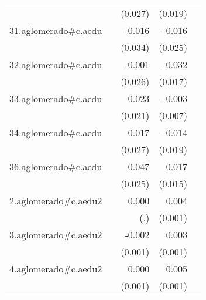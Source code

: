 {\begin{longtable}{l*{4}{D{.}{.}{-1}}}
            &                     &     (0.027)         &     (0.019)         &                     \\
\addlinespace
31.aglomerado#c.aedu&                     &      -0.016         &      -0.016         &                     \\
            &                     &     (0.034)         &     (0.025)         &                     \\
\addlinespace
32.aglomerado#c.aedu&                     &      -0.001         &      -0.032         &                     \\
            &                     &     (0.026)         &     (0.017)         &                     \\
\addlinespace
33.aglomerado#c.aedu&                     &       0.023         &      -0.003         &                     \\
            &                     &     (0.021)         &     (0.007)         &                     \\
\addlinespace
34.aglomerado#c.aedu&                     &       0.017         &      -0.014         &                     \\
            &                     &     (0.027)         &     (0.019)         &                     \\
\addlinespace
36.aglomerado#c.aedu&                     &       0.047         &       0.017         &                     \\
            &                     &     (0.025)         &     (0.015)         &                     \\
\addlinespace
2.aglomerado#c.aedu2&                     &       0.000         &       0.004\sym{***}&                     \\
            &                     &         (.)         &     (0.001)         &                     \\
\addlinespace
3.aglomerado#c.aedu2&                     &      -0.002         &       0.003\sym{**} &                     \\
            &                     &     (0.001)         &     (0.001)         &                     \\
\addlinespace
4.aglomerado#c.aedu2&                     &       0.000         &       0.005\sym{***}&                     \\
            &                     &     (0.001)         &     (0.001)         &                     \\

\end{longtable}}
